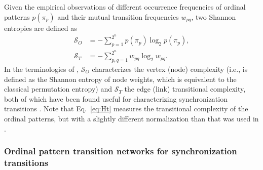		Given the empirical observations of different occurrence frequencies of ordinal patterns $p(\pi_p)$ and their mutual transition frequencies $w_{pq}$, two Shannon entropies are defined as 
		\begin{align} \label{eq:Ho}
		\mathcal{S}_O &= - \sum_{p=1}^{2^n} p(\pi_p) \log_2 p(\pi_p) , \\ \label{eq:Ht}
		\mathcal{S}_T &= - \sum_{p,q=1}^{2^{n}} w_{pq} \log_2 w_{pq}. 
		\end{align}
		In the terminologies of \cite{McCullough2017b}, $\mathcal{S}_{O}$ characterizes the vertex (node) complexity (i.e., is defined as the Shannon entropy of node weights, which is equivalent to the classical permutation entropy) and $\mathcal{S}_{T}$ the edge (link) transitional complexity, both of which have been found useful for characterizing synchronization transitions \cite{Zhang2017b}. Note that Eq.~\eqref{eq:Ht} measures the transitional complexity of the ordinal patterns, but with a slightly different normalization than that was used in \cite{McCullough2017b,Small2018}. 
		
\subsubsection{Ordinal pattern transition networks for synchronization transitions}

